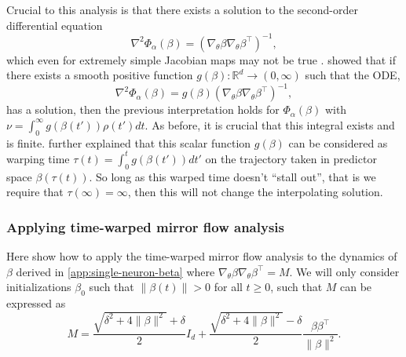\documentclass{article}
\theoremstyle{plain}
\theoremstyle{definition}
\theoremstyle{remark}
\begin{document}
%
Crucial to this analysis is that there exists a solution to the second-order differential equation
\begin{equation}
    \nabla^2 \Phi_\alpha(\beta) = \left(\nabla_\theta \beta \nabla_\theta \beta^\intercal\right)^{-1},
\end{equation}
which even for extremely simple Jacobian maps may not be true \cite{gunasekar2021mirrorless}.
%
\citet{azulay2021implicit} showed that if there exists a smooth positive function $g(\beta) : \mathbb{R}^d \to (0,\infty)$ such that the ODE,
\begin{equation}
    \nabla^2 \Phi_\alpha(\beta) = g(\beta)\left(\nabla_\theta \beta \nabla_\theta \beta^\intercal\right)^{-1},
\end{equation}
has a solution, then the previous interpretation holds for $\Phi_\alpha(\beta)$ with $\nu = \int_0^\infty g(\beta(t'))\rho(t')dt$.
%
As before, it is crucial that this integral exists and is finite.
%
\citet{azulay2021implicit} further explained that this scalar function $g(\beta)$ can be considered as warping time $\tau(t) = \int_0^tg(\beta(t'))dt'$ on the trajectory taken in predictor space $\beta(\tau(t))$.
%
So long as this warped time doesn't ``stall out'', that is we require that $\tau(\infty) = \infty$, then this will not change the interpolating solution.


\subsubsection{Applying time-warped mirror flow analysis}

Here show how to apply the time-warped mirror flow analysis to the dynamics of $\beta$ derived in \cref{app:single-neuron-beta} where $\nabla_\theta \beta \nabla_\theta \beta^\intercal = M$.
%
We will only consider initializations $\beta_0$ such that $\|\beta(t)\| > 0$ for all $t \ge 0$, such that $M$ can be expressed as
\begin{equation}
    M = \frac{\sqrt{\delta^2 + 4\|\beta\|^2} + \delta}{2}I_d + \frac{\sqrt{\delta^2 + 4\|\beta\|^2} - \delta}{2}\frac{\beta\beta^\intercal}{\|\beta\|^2}.
\end{equation}
\end{document}
